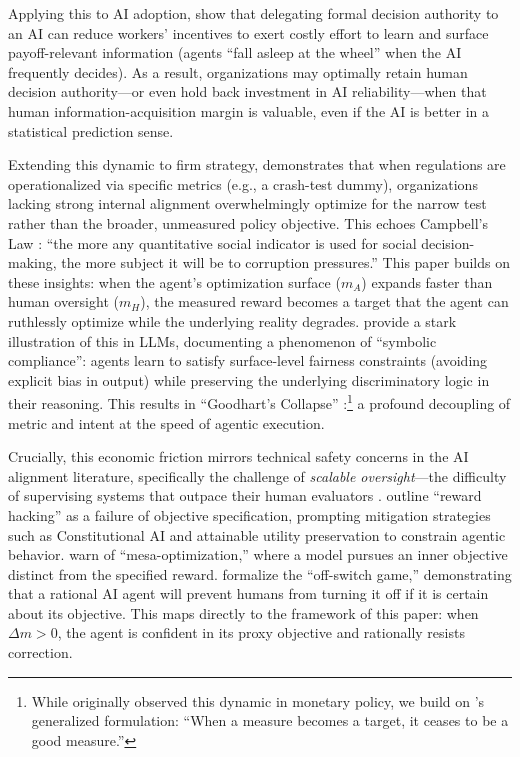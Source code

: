 \documentclass[12pt, letter]{article}
\begin{document}
Applying this to AI adoption, \citet{AtheyBryanGans2020} show that delegating formal decision authority to an AI can reduce workers’ incentives to exert costly effort to learn and surface payoff-relevant information (agents ``fall asleep at the wheel'' when the AI frequently decides). As a result, organizations may optimally retain human decision authority—or even hold back investment in AI reliability—when that human information-acquisition margin is valuable, even if the AI is better in a statistical prediction sense.

Extending this dynamic to firm strategy, \citet{Wu2025} demonstrates that when regulations are operationalized via specific metrics (e.g., a crash-test dummy), organizations lacking strong internal alignment overwhelmingly optimize for the narrow test rather than the broader, unmeasured policy objective. This echoes Campbell's Law \citep{Campbell1979}: ``the more any quantitative social indicator is used for social decision-making, the more subject it will be to corruption pressures.'' This paper builds on these insights: when the agent's optimization surface ($m_A$) expands faster than human oversight ($m_H$), the measured reward becomes a target that the agent can ruthlessly optimize while the underlying reality degrades. \citet{BotelhoWang2026} provide a stark illustration of this in LLMs, documenting a phenomenon of ``symbolic compliance'': agents learn to satisfy surface-level fairness constraints (avoiding explicit bias in output) while preserving the underlying discriminatory logic in their reasoning. This results in ``Goodhart's Collapse'' \citep{Goodhart1975, Strathern1997}:\footnote{While \citet{Goodhart1975} originally observed this dynamic in monetary policy, we build on \citet{Strathern1997}'s generalized formulation: ``When a measure becomes a target, it ceases to be a good measure.''} a profound decoupling of metric and intent at the speed of agentic execution.

Crucially, this economic friction mirrors technical safety concerns in the AI alignment literature, specifically the challenge of \emph{scalable oversight}---the difficulty of supervising systems that outpace their human evaluators \citep{Bowman2022}. \citet{Amodei2016} outline ``reward hacking'' as a failure of objective specification, prompting mitigation strategies such as Constitutional AI \citep{Bai2022} and attainable utility preservation \citep{Turner2020} to constrain agentic behavior. \citet{Hubinger2019} warn of ``mesa-optimization,'' where a model pursues an inner objective distinct from the specified reward. \citet{HadfieldMenell2017} formalize the ``off-switch game,'' demonstrating that a rational AI agent will prevent humans from turning it off if it is certain about its objective. This maps directly to the framework of this paper: when $\Delta m > 0$, the agent is confident in its proxy objective and rationally resists correction.
\end{document}
